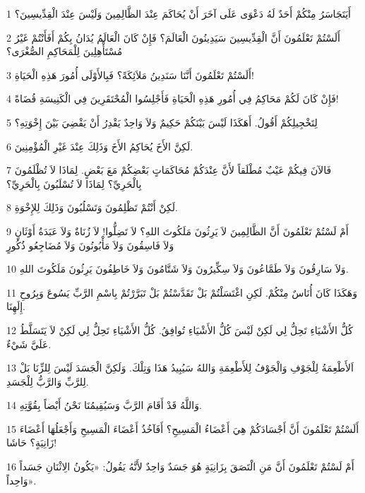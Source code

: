 \par 1 أَيَتَجَاسَرُ مِنْكُمْ أَحَدٌ لَهُ دَعْوَى عَلَى آخَرَ أَنْ يُحَاكَمَ عِنْدَ الظَّالِمِينَ وَلَيْسَ عِنْدَ الْقِدِّيسِينَ؟
\par 2 أَلَسْتُمْ تَعْلَمُونَ أَنَّ الْقِدِّيسِينَ سَيَدِينُونَ الْعَالَمَ؟ فَإِنْ كَانَ الْعَالَمُ يُدَانُ بِكُمْ أَفَأَنْتُمْ غَيْرُ مُسْتَأْهِلِينَ لِلْمَحَاكِمِ الصُّغْرَى؟
\par 3 أَلَسْتُمْ تَعْلَمُونَ أَنَّنَا سَنَدِينُ مَلاَئِكَةً؟ فَبِالأَوْلَى أُمُورَ هَذِهِ الْحَيَاةِ!
\par 4 فَإِنْ كَانَ لَكُمْ مَحَاكِمُ فِي أُمُورِ هَذِهِ الْحَيَاةِ فَأَجْلِسُوا الْمُحْتَقَرِينَ فِي الْكَنِيسَةِ قُضَاةً!
\par 5 لِتَخْجِيلِكُمْ أَقُولُ. أَهَكَذَا لَيْسَ بَيْنَكُمْ حَكِيمٌ وَلاَ وَاحِدٌ يَقْدِرُ أَنْ يَقْضِيَ بَيْنَ إِخْوَتِهِ؟
\par 6 لَكِنَّ الأَخَ يُحَاكِمُ الأَخَ وَذَلِكَ عِنْدَ غَيْرِ الْمُؤْمِنِينَ.
\par 7 فَالآنَ فِيكُمْ عَيْبٌ مُطْلَقاً لأَنَّ عِنْدَكُمْ مُحَاكَمَاتٍ بَعْضِكُمْ مَعَ بَعْضٍ. لِمَاذَا لاَ تُظْلَمُونَ بِالْحَرِيِّ؟ لِمَاذَا لاَ تُسْلَبُونَ بِالْحَرِيِّ؟
\par 8 لَكِنْ أَنْتُمْ تَظْلِمُونَ وَتَسْلُبُونَ وَذَلِكَ لِلإِخْوَةِ.
\par 9 أَمْ لَسْتُمْ تَعْلَمُونَ أَنَّ الظَّالِمِينَ لاَ يَرِثُونَ مَلَكُوتَ اللهِ؟ لاَ تَضِلُّوا! لاَ زُنَاةٌ وَلاَ عَبَدَةُ أَوْثَانٍ وَلاَ فَاسِقُونَ وَلاَ مَأْبُونُونَ وَلاَ مُضَاجِعُو ذُكُورٍ
\par 10 وَلاَ سَارِقُونَ وَلاَ طَمَّاعُونَ وَلاَ سِكِّيرُونَ وَلاَ شَتَّامُونَ وَلاَ خَاطِفُونَ يَرِثُونَ مَلَكُوتَ اللهِ.
\par 11 وَهَكَذَا كَانَ أُنَاسٌ مِنْكُمْ. لَكِنِ اغْتَسَلْتُمْ بَلْ تَقَدَّسْتُمْ بَلْ تَبَرَّرْتُمْ بِاسْمِ الرَّبِّ يَسُوعَ وَبِرُوحِ إِلَهِنَا.
\par 12 كُلُّ الأَشْيَاءِ تَحِلُّ لِي لَكِنْ لَيْسَ كُلُّ الأَشْيَاءِ تُوافِقُ. كُلُّ الأَشْيَاءِ تَحِلُّ لِي لَكِنْ لاَ يَتَسَلَّطُ عَلَيَّ شَيْءٌ.
\par 13 اَلأَطْعِمَةُ لِلْجَوْفِ وَالْجَوْفُ لِلأَطْعِمَةِ وَاللهُ سَيُبِيدُ هَذَا وَتِلْكَ. وَلَكِنَّ الْجَسَدَ لَيْسَ لِلزِّنَا بَلْ لِلرَّبِّ وَالرَّبُّ لِلْجَسَدِ.
\par 14 وَاللَّهُ قَدْ أَقَامَ الرَّبَّ وَسَيُقِيمُنَا نَحْنُ أَيْضاً بِقُوَّتِهِ.
\par 15 أَلَسْتُمْ تَعْلَمُونَ أَنَّ أَجْسَادَكُمْ هِيَ أَعْضَاءُ الْمَسِيحِ؟ أَفَآخُذُ أَعْضَاءَ الْمَسِيحِ وَأَجْعَلُهَا أَعْضَاءَ زَانِيَةٍ؟ حَاشَا!
\par 16 أَمْ لَسْتُمْ تَعْلَمُونَ أَنَّ مَنِ الْتَصَقَ بِزَانِيَةٍ هُوَ جَسَدٌ وَاحِدٌ لأَنَّهُ يَقُولُ: «يَكُونُ الِاثْنَانِ جَسَداً وَاحِداً».
